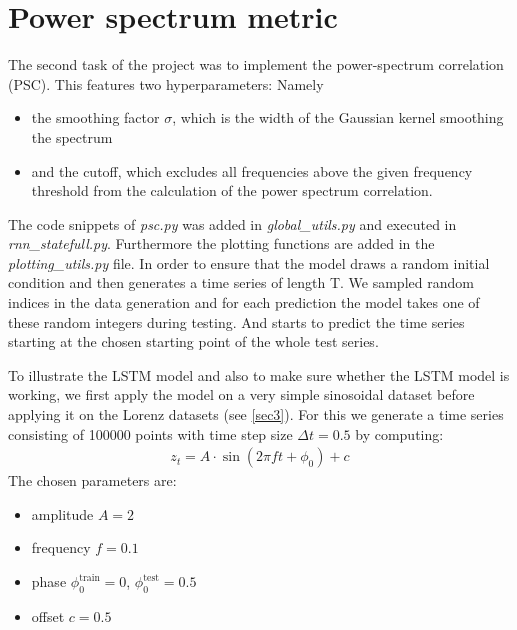 \section{Power spectrum metric}

The second task of the project was to implement the power-spectrum correlation (PSC). This features two hyperparameters: Namely
\begin{itemize}
	\item the smoothing factor $\sigma$, which is the width of the Gaussian kernel smoothing the spectrum
	\item and the cutoff, which excludes all frequencies above the given frequency threshold from the calculation of the power spectrum correlation.
\end{itemize}
The code snippets of \textit{psc.py} was added in \textit{global\_utils.py} and executed in \textit{rnn\_statefull.py}. Furthermore the plotting functions are added in the \textit{plotting\_utils.py} file.
In order to ensure that the model draws a random initial condition and then generates a time series of length T. We sampled random indices in the data generation and for each prediction the model takes one of these random integers during testing. And starts to predict the time series starting at the chosen starting point of the whole test series.

To illustrate the LSTM model and also to make sure whether the LSTM model is working, we first apply the model on a very simple sinosoidal dataset before applying it on the Lorenz datasets (see \cref{sec3}). For this we generate a time series consisting of 100000 points with time step size $\Delta t=0.5$ by computing:
\begin{align}
	z_t = A\cdot\sin(2\pi ft+\phi_0)+c
\end{align}
The chosen parameters are:
\begin{itemize}
	\setlength\itemsep{0.1em}
	\item amplitude $A = 2$
	\item frequency $f = 0.1$
	\item phase $\phi_0^{\text{train}}=0$, $\phi_0^{\text{test}}=0.5$
	\item offset $c=0.5$
\end{itemize}

